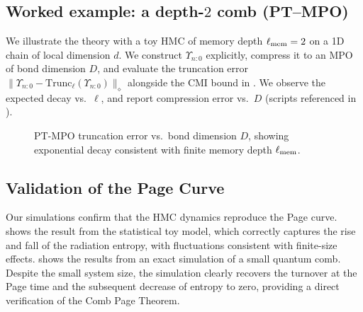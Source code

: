\documentclass[aps,prd,preprint,onecolumn,superscriptaddress,nofootinbib,longbibliography,floatfix,11pt,showpacs,showkeys]{revtex4-2}
\newcommand{\HMC}{\textsc{HMC}\xspace}
\theoremstyle{plain}
\theoremstyle{definition}
\theoremstyle{remark}
\begin{document}
\subsection{Worked example: a depth-$2$ comb (PT--MPO)}

\label{sec:worked-example}
We illustrate the theory with a toy \HMC{} of memory depth $\ell_{\rm mem}=2$ on a 1D chain of local dimension $d$.
We construct $\Upsilon_{n{:}0}$ explicitly, compress it to an MPO of bond dimension $D$, and evaluate the truncation error
$\|\Upsilon_{n{:}0}-\mathrm{Trunc}_\ell(\Upsilon_{n{:}0})\|_\diamond$ alongside the CMI bound in .
We observe the expected decay vs.\ $\ell$, and report compression error vs.\ $D$ (scripts referenced in ).

\begin{figure}[htbp]
\centering
{}
\caption{PT-MPO truncation error vs.\ bond dimension $D$, showing exponential decay consistent with finite memory depth $\ell_{\rm mem}$.}
\label{fig:truncation_error}
\label{fig:bond-dim-scaling}
\end{figure}

\subsection{Validation of the Page Curve}
Our simulations confirm that the \HMC{} dynamics reproduce the Page curve.  shows the result from the statistical toy model, which correctly captures the rise and fall of the radiation entropy, with fluctuations consistent with finite-size effects.  shows the results from an exact simulation of a small quantum comb. Despite the small system size, the simulation clearly recovers the turnover at the Page time and the subsequent decrease of entropy to zero, providing a direct verification of the Comb Page Theorem.
\end{document}
